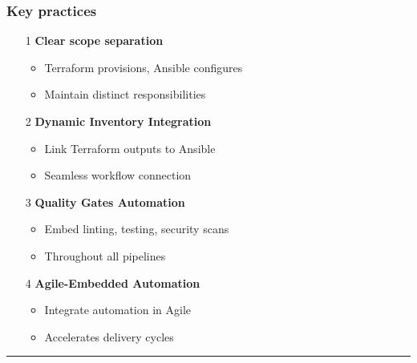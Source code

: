 \documentclass{beamer}
\begin{document}
\begin{frame}
\frametitle{Key practices}

\begin{itemize}
    \item[1] \textcolor{soleneBlue}{\textbf{Clear scope separation}}
    \begin{itemize}
        \footnotesize
        \item Terraform provisions, Ansible configures
        \item Maintain distinct responsibilities
    \end{itemize}
    
    \vspace{0.4cm}
    
    \item[2] \textcolor{soleneBlue}{\textbf{Dynamic Inventory Integration}}
    \begin{itemize}
        \footnotesize
        \item Link Terraform outputs to Ansible
        \item Seamless workflow connection
    \end{itemize}
    
    \vspace{0.4cm}
    
    \item[3] \textcolor{soleneBlue}{\textbf{Quality Gates Automation}}
    \begin{itemize}
        \footnotesize
        \item Embed linting, testing, security scans
        \item Throughout all pipelines
    \end{itemize}
    
    \vspace{0.4cm}
    
    \item[4] \textcolor{soleneBlue}{\textbf{Agile-Embedded Automation}}
    \begin{itemize}
        \footnotesize
        \item Integrate automation in Agile
        \item Accelerates delivery cycles
    \end{itemize}
\end{itemize}

\begin{center}
\textcolor{soleneBlue}{\rule{0.8\textwidth}{0.5pt}}
\end{center}
\end{frame}
\end{document}
